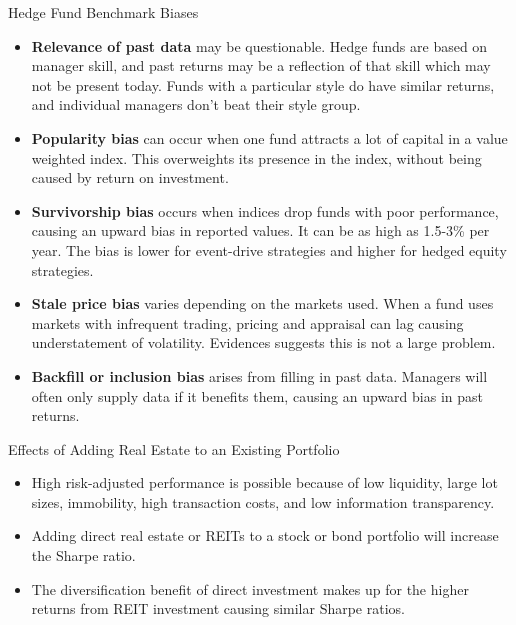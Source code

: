 \documentclass[../custom]{flashcards}
\begin{document}
\begin{flashcard}{Hedge Fund Benchmark Biases}
    \begin{itemize}
        \item \textbf{Relevance of past data} may be questionable. Hedge funds are based on manager skill, and past returns may be a reflection of that skill which may not be present today. Funds with a particular style do have similar returns, and individual managers don't beat their style group.
        \item \textbf{Popularity bias} can occur when one fund attracts a lot of capital in a value weighted index. This overweights its presence in the index, without being caused by return on investment.
        \item \textbf{Survivorship bias} occurs when indices drop funds with poor performance, causing an upward bias in reported values. It can be as high as 1.5-3\% per year. The bias is lower for event-drive strategies and higher for hedged equity strategies.
        \item \textbf{Stale price bias} varies depending on the markets used. When a fund uses markets with infrequent trading, pricing and appraisal can lag causing understatement of volatility. Evidences suggests this is not a large problem.
        \item \textbf{Backfill or inclusion bias} arises from filling in past data. Managers will often only supply data if it benefits them, causing an upward bias in past returns.
    \end{itemize}
\end{flashcard}

\begin{flashcard}{Effects of Adding Real Estate to an Existing Portfolio}
    \begin{itemize}
        \item  High risk-adjusted performance is possible because of low liquidity, large lot sizes, immobility, high transaction costs, and low information transparency.
        \item Adding direct real estate or REITs to a stock or bond portfolio will increase the Sharpe ratio.
        \item The diversification benefit of direct investment makes up for the higher returns from REIT investment causing similar Sharpe ratios.
    \end{itemize}
\end{flashcard}
\end{document}
